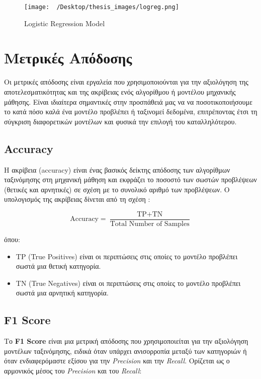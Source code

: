 \documentclass[diploma]{softlab-thesis}
\begin{document}
\begin{figure}[h]
    \centering
    \texttt{[image: ~/Desktop/thesis\_images/logreg.png]} %
    \caption{Logistic
     Regression Model}
    \label{fig:your_image_label}
\end{figure}


\section{Μετρικές Απόδοσης}

Οι μετρικές απόδοσης είναι εργαλεία που χρησιμοποιούνται για την αξιολόγηση της αποτελεσματικότητας και της ακρίβειας ενός αλγορίθμου ή μοντέλου μηχανικής μάθησης. Είναι ιδιαίτερα σημαντικές στην προσπάθειά μας να να ποσοτικοποιήσουμε το κατά πόσο καλά ένα μοντέλο προβλέπει ή ταξινομεί δεδομένα, επιτρέποντας έτσι τη σύγκριση διαφορετικών μοντέλων και φυσικά την επιλογή του καταλληλότερου.

\subsection{Accuracy}

Η ακρίβεια (accuracy) είναι ένας βασικός δείκτης απόδοσης των αλγορίθμων ταξινόμησης στη μηχανική μάθηση και εκφράζει το ποσοστό των σωστών προβλέψεων (θετικές και αρνητικές) σε σχέση με το συνολικό αριθμό των προβλέψεων. Ο υπολογισμός της ακρίβειας δίνεται από τη σχέση : 

\[
\text{Accuracy} = \frac{\text{TP} + \text{TN}}{\text{Total Number of Samples}}
\]

όπου:

\begin{itemize}
\item TP (True Positives) είναι οι περιπτώσεις στις οποίες το μοντέλο προβλέπει σωστά μια θετική κατηγορία.
\item TN (True Negatives) είναι οι περιπτώσεις στις οποίες το μοντέλο προβλέπει σωστά μια αρνητική κατηγορία.
\end{itemize}


\subsection{F1 Score}

Το \textbf{F1 Score} είναι μια μετρική απόδοσης που χρησιμοποιείται για την αξιολόγηση μοντέλων ταξινόμησης, ειδικά όταν υπάρχει ανισορροπία μεταξύ των κατηγοριών ή όταν ενδιαφερόμαστε εξίσου για την \textit{Precision} και την \textit{Recall}. Ορίζεται ως ο αρμονικός μέσος του \textit{Precision} και του \textit{Recall}:
\end{document}

